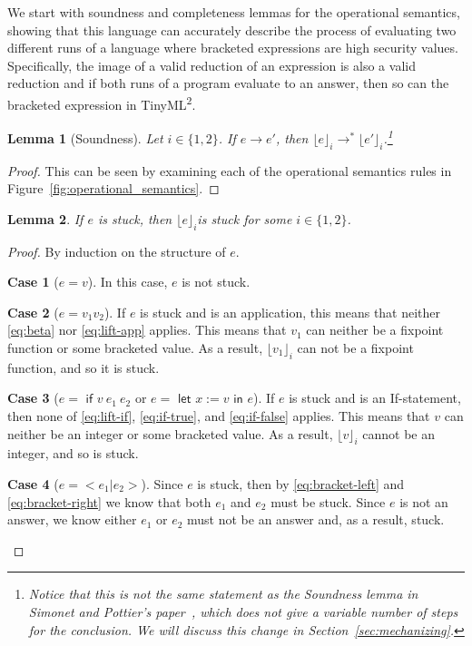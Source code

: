 \documentclass[a4paper,twocolumn]{article}
\newcommand{\langName}[0]{TinyML\textsuperscript{2}}
\newcommand{\lift}[1]{\lfloor #1 \rfloor}
\theoremstyle{plain}
\newtheorem{lemma}{Lemma}
\theoremstyle{definition}
\newtheorem*{case}{Case}
\begin{document}
We start with soundness and completeness lemmas for the operational semantics,
showing that this language can accurately describe the process of evaluating two
different runs of a language where bracketed expressions are high security
values.  Specifically, the image of a valid reduction of an expression is also a
valid reduction and if both runs of a program evaluate to an answer, then so can
the bracketed expression in \langName.

\begin{lemma}[Soundness]
  \label{lem:soundness}
  Let $i \in \{1, 2\}$. If $e \to e'$, then $\lift{e}_i \to^*
  \lift{e'}_i$.\footnote{Notice that this is not the same statement as the
  Soundness lemma in Simonet and Pottier's paper~\cite{InfoFlowML}, which does
  not give a variable number of steps for the conclusion.  We will discuss this
  change in Section~\ref{sec:mechanizing}.}
\end{lemma}
\begin{proof}
  This can be seen by examining each of the operational semantics rules in
  Figure~\ref{fig:operational_semantics}.
\end{proof}

\begin{lemma}
  \label{lem:stuck_bracket}
  If $e$ is stuck, then $\lift{e}_i$is stuck for some $i \in \{1, 2\}$.
\end{lemma}
\begin{proof}
  By induction on the structure of $e$.

  \begin{case}[$e = v$]
    In this case, $e$ is not stuck.
  \end{case}

  \begin{case}[$e = v_1 v_2$]
    If $e$ is stuck and is an application, this means that neither
    \ref{eq:beta} nor \ref{eq:lift-app} applies.  This means that $v_1$ can
    neither be a fixpoint function or some bracketed value.  As a result,
    $\lift{v_1}_i$ can not be a fixpoint function, and so it is stuck.
  \end{case}

  \begin{case}[$e = \textsf{ if } v \: e_1 \: e_2$ or $e =
    \textsf{ let } x := v \textsf{ in } e$]
    If $e$ is stuck and is an If-statement, then none of \ref{eq:lift-if}, \ref{eq:if-true}, and \ref{eq:if-false} applies. This means that $v$ can neither
    be an integer or some bracketed value.  As a result, $\lift{v}_i$ cannot
    be an integer, and so is stuck.
  \end{case}

  \begin{case}[$e = < e_1 | e_2 >$]
    Since $e$ is stuck, then by \ref{eq:bracket-left} and \ref{eq:bracket-right}
    we know that both $e_1$ and $e_2$ must be stuck.  Since $e$ is not an
    answer, we know either $e_1$ or $e_2$ must not be an answer and, as a
    result, stuck.
  \end{case}
\end{proof}
\end{document}
